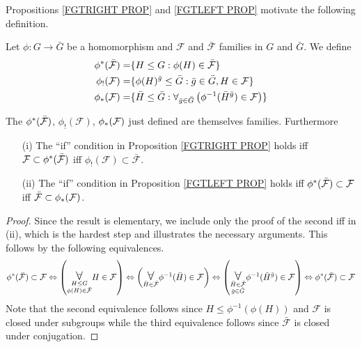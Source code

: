 \documentclass[a4paper,10pt]{article}%
\begin{document}
Propositions \ref{FGTRIGHT PROP} and \ref{FGTLEFT PROP}
motivate the following definition.

\begin{definition}
	Let $\phi \colon G \to \bar{G}$ be a homomorphism and $\mathcal{F}$ and $\bar{\mathcal{F}}$ families in $G$
	and $\bar{G}$. We define
\begin{align}\label{PHISTARDEF EQ}
	\phi^{\**}(\bar{\mathcal{F}})
		=&
	\{H \leq G : \phi(H) \in \bar{\mathcal{F}}\}
\\
	\phi_!(\mathcal{F})
		=&
	\{\phi(H)^{\bar{g}}\leq \bar{G} : \bar{g} \in \bar{G}, H \in \mathcal{F}\}
\\ \label{PHISTARDEF3 EQ}
	\phi_{\**}(\mathcal{F})
		=&
	\{\bar{H} \leq \bar{G} : 
	\forall_{\bar{g} \in \bar{G}} 
	\left(
	\phi^{-1}(\bar{H}^{\bar{g}}) \in \mathcal{F}
	\right)\}
\end{align}
\end{definition}

\begin{lemma}
The $\phi^{\**}(\bar{\mathcal{F}})$, $\phi_{!}(\mathcal{F})$, $\phi_{\**}(\mathcal{F})$ just defined are 
themselves families. Furthermore
\begin{itemize}
\item[(i)] The ``if'' condition in Proposition \ref{FGTRIGHT PROP} holds iff 
$\mathcal{F} \subset \phi^{\**} (\bar{\mathcal{F}})$
iff
$\phi_{!}(\mathcal{F}) \subset \bar{\mathcal{F}}$.
\item [(ii)]
The ``if'' condition in Proposition \ref{FGTLEFT PROP} holds iff 
$\phi^{\**} (\bar{\mathcal{F}}) \subset \mathcal{F}$
iff
$\bar{\mathcal{F}} \subset \phi_{\**}(\mathcal{F})$.
\end{itemize}
\end{lemma}


\begin{proof}
	Since the result is elementary, we include only the proof of the second iff in (ii), which is the hardest step and illustrates the necessary arguments. This follows by the following equivalences.
\[
	\phi^{\**} (\bar{\mathcal{F}}) \subset \mathcal{F}
\Leftrightarrow
	\left( \underset{ \substack{H \leq G \\ \phi(H) \in \bar{\mathcal{F}} }}{\mathlarger{\mathlarger{\forall}}} 
	H \in \mathcal{F} \right)
\Leftrightarrow
	\left( \underset{\bar{H} \in \bar{\mathcal{F}}}{\mathlarger{\mathlarger{\forall}}}
	\phi^{-1}(\bar{H}) \in \mathcal{F}
	\right)
\Leftrightarrow
	\left( \underset{ \substack{\bar{H} \in \bar{\mathcal{F}}\\\bar{g} \in \bar{G}}}{\mathlarger{\mathlarger{\forall}}}
	\phi^{-1}(\bar{H}^{\bar{g}}) \in \mathcal{F}
	\right)
\Leftrightarrow
	\phi^{\**} (\bar{\mathcal{F}}) \subset \mathcal{F}
\]
Note that the second equivalence follows since 
$H \leq \phi^{-1}(\phi(H))$ and $\mathcal{F}$ is closed under subgroups while the third equivalence follows since 
$\bar{\mathcal{F}}$ is closed under conjugation. 
\end{proof}
\end{document}
